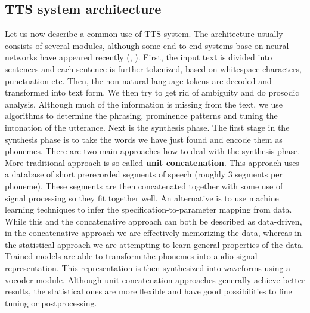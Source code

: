 \subsection*{TTS system architecture}
Let us now describe a common use of TTS system.
The architecture usually consists of several modules, although some end-to-end systems base on neural networks have appeared recently (\cite{van2016wavenet}, \cite{wang2017tacotron}).
First, the input text is divided into sentences and each sentence is further tokenized, based on whitespace characters, punctuation etc.
Then, the non-natural language tokens are decoded and transformed into text form.
We then try to get rid of ambiguity and do prosodic analysis.
Although much of the information is missing from the text, we use algorithms to determine the phrasing, prominence patterns and tuning the intonation of the utterance.
\linebreak\linebreak
Next is the synthesis phase. The first stage in the synthesis phase is to take the words we have just found and encode them as phonemes.
There are two main approaches how to deal with the synthesis phase.
More traditional approach is so called \textbf{unit concatenation}.
This approach uses a database of short prerecorded segments of speech (roughly 3 segments per phoneme).
These segments are then concatenated together with some use of signal processing so they fit together well.
An alternative is to use machine learning techniques to infer the specification-to-parameter mapping from data.
While this and the concatenative approach can both be described as data-driven, in the concatenative approach we are effectively memorizing the data, whereas in the statistical approach we are attempting to learn general properties of the data.
\linebreak\linebreak
Trained models are able to transform the phonemes into audio signal representation.
This representation is then synthesized into waveforms using a vocoder module.
Although unit concatenation approaches generally achieve better results, the statistical ones are more flexible and have good possibilities to fine tuning or postprocessing.
